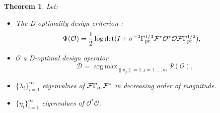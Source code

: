 \documentclass[ba]{imsart}
\newcommand{\obs}{\mathcal{O}}
\newcommand{\fwd}{\mathcal{F}}
\newcommand{\tar}{\Psi}
\DeclareMathOperator*{\argmax}{arg\,max}
\newcommand{\data}{\mathbf{d}}
\newcommand{\param}{\mathbf{m}}
\newcommand{\pr}{\mu_{\textup{pr}}} \newcommand{\post}{\mu_{\textup{post}}} \newcommand{\prmean}{\param_{\textup{pr}}} \newcommand{\postmean}{\param_{\textup{post}}} \newcommand{\postcov}{\Gamma_{\textup{post}}} \newcommand{\prcov}{\Gamma_{\textup{pr}}} \newcommand{\modcov}{\Gamma_{\textup{model}}} \newcommand{\tmp}{\mathcal{G}}
\newcommand{\meas}{\mathbf{o}}
\newcommand{\ev}{\mathbf{e}} \newcommand{\func}{\mathbf{a}}
\newcommand{\opt}{\mathcal{D}}
\theoremstyle{plain}
\newtheorem{theorem}{Theorem}
\theoremstyle{definition}
\theoremstyle{remark}
\providecommand{\DIFaddtex}[1]{{\protect\color{blue}\uwave{#1}}} %
\providecommand{\DIFdeltex}[1]{{\protect\color{red}\sout{#1}}}                      %
\providecommand{\DIFaddbegin}{} %
\providecommand{\DIFaddend}{} %
\providecommand{\DIFdelbegin}{} %
\providecommand{\DIFdelend}{} %
\providecommand{\DIFadd}[1]{\texorpdfstring{\DIFaddtex{#1}}{#1}} %
\providecommand{\DIFdel}[1]{\texorpdfstring{\DIFdeltex{#1}}{}} %
\newcommand{\DIFscaledelfig}{0.5}
\newlength{\DIFdelgraphicswidth} %
\newlength{\DIFdelgraphicsheight} %
\newcommand{\DIFaddincludegraphics}[2][]{{\color{blue}\fbox{\DIFOincludegraphics[#1]{#2}}}} %
\newcommand{\DIFdelincludegraphics}[2][]{%
\sbox{\DIFdelgraphicsbox}{\DIFOincludegraphics[#1]{#2}}%
\settoboxwidth{\DIFdelgraphicswidth}{\DIFdelgraphicsbox} %
\settoboxtotalheight{\DIFdelgraphicsheight}{\DIFdelgraphicsbox} %
\scalebox{\DIFscaledelfig}{%
\parbox[b]{\DIFdelgraphicswidth}{\usebox{\DIFdelgraphicsbox}\\[-\baselineskip] \rule{\DIFdelgraphicswidth}{0em}}\llap{\resizebox{\DIFdelgraphicswidth}{\DIFdelgraphicsheight}{%
\setlength{\unitlength}{\DIFdelgraphicswidth}%
\begin{picture}(1,1)%
\thicklines\linethickness{2pt} %
{\color[rgb]{1,0,0}\put(0,0){\framebox(1,1){}}}%
{\color[rgb]{1,0,0}\put(0,0){\line( 1,1){1}}}%
{\color[rgb]{1,0,0}\put(0,1){\line(1,-1){1}}}%
\end{picture}%
}\hspace*{3pt}}} %
} %
\DeclareRobustCommand{\DIFaddbegin}{\DIFOaddbegin \let\includegraphics\DIFaddincludegraphics} %
\DeclareRobustCommand{\DIFaddend}{\DIFOaddend \let\includegraphics\DIFOincludegraphics} %
\DeclareRobustCommand{\DIFdelbegin}{\DIFOdelbegin \let\includegraphics\DIFdelincludegraphics} %
\DeclareRobustCommand{\DIFdelend}{\DIFOaddend \let\includegraphics\DIFOincludegraphics} %
\begin{document}
\DIFdelend \begin{theorem}\label{thm:char}
  Let:
  \begin{itemize}
    \item The D-optimality design criterion
    \cite{AlexanderianGloorGhattas14}:
    \DIFdelbegin %
\DIFdelend \DIFaddbegin \begin{align*}
      \begin{split}
        \tar(\obs) &= \frac{1}{2} \log \det ( I + \sigma^{-2} \prcov^{1/2} \fwd ^*
        \obs^* \obs \fwd \prcov^{1/2}), 
      \end{split}
    \end{align*}\DIFaddend 
  \item \DIFdelbegin \DIFdel{\(\obs\) }\DIFdelend \DIFaddbegin \DIFadd{\(\opt\) }\DIFaddend a D-optimal design operator
    \DIFdelbegin %
\DIFdelend \DIFaddbegin \begin{equation*}
      \opt = \argmax_{\|\meas_j\| = 1, j=1,\dots,m}\tar(\obs),
    \end{equation*}\DIFaddend 
  \item \(\{\lambda_i\}_{i=1}^\infty\) eigenvalues of
    \(\fwd\prcov\fwd^*\) in decreasing order of magnitude.
  \item \(\{\eta_i\}_{i=1}^\infty\) eigenvalues of \DIFdelbegin \DIFdel{\(\obs^*\obs\)}\DIFdelend \DIFaddbegin \DIFadd{\(\opt^*\opt\)}\DIFaddend .

  \end{itemize}


\end{theorem}
\end{document}
